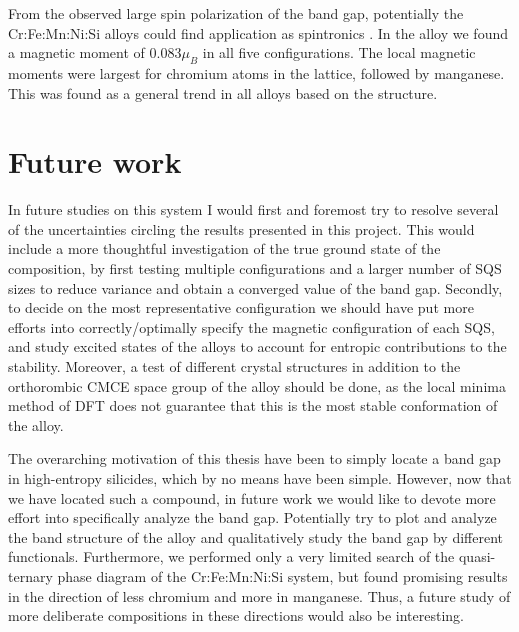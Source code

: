 \documentclass[UKenglish]{ifimaster}  %
\begin{document}
From the observed large spin polarization of the band gap, potentially the Cr:Fe:Mn:Ni:Si alloys could find application as spintronics \cite{spintronic}. In the  alloy we found a magnetic moment of $0.083 \mu_B$ in all five configurations. The local magnetic moments were largest for chromium atoms in the lattice, followed by manganese. This was found as a general trend in all alloys based on the  structure.  


\chapter{Future work}

In future studies on this system I would first and foremost try to resolve several of the uncertainties circling the results presented in this project. This would include a more thoughtful investigation of the true ground state of the  composition, by first testing multiple configurations and a larger number of SQS sizes to reduce variance and obtain a converged value of the band gap. Secondly, to decide on the most representative configuration we should have put more efforts into correctly/optimally specify the magnetic configuration of each SQS, and study excited states of the alloys to account for entropic contributions to the stability.  Moreover, a test of different crystal structures in addition to the orthorombic CMCE space group of the  alloy should be done, as the local minima method of DFT does not guarantee that this is the most stable conformation of the alloy.

The overarching motivation of this thesis have been to simply locate a band gap in high-entropy silicides, which by no means have been simple. However, now that we have located such a compound, in future work we would like to devote more effort into specifically analyze the band gap. Potentially try to plot and analyze the band structure of the alloy and qualitatively study the band gap by different functionals.  Furthermore, we performed only a very limited search of the quasi-ternary phase diagram of the Cr:Fe:Mn:Ni:Si system, but found promising results in the direction of less chromium and more in manganese. Thus, a future study of more deliberate compositions in these directions would also be interesting.


\appendix


\backmatter{}
\printbibliography
\end{document}
